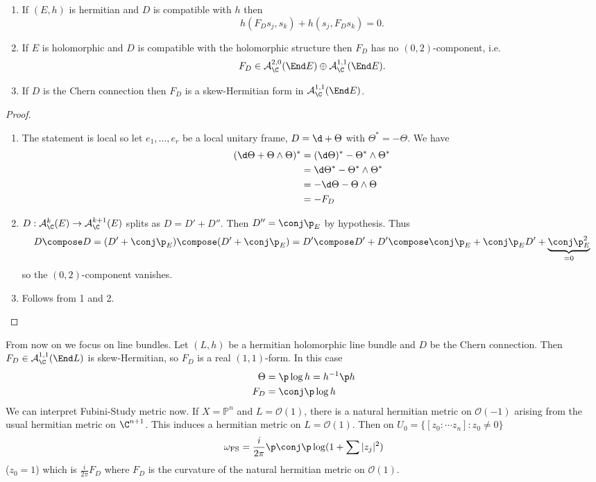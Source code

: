 \documentclass[a4paper]{article}
\renewcommand{\P}{\mathbb P} %
\newcommand{\w}{\wedge} %
\begin{document}
\begin{lemma}\leavevmode
  \begin{enumerate}
  \item If \((E, h)\) is hermitian and \(D\) is compatible with \(h\) then
    \[
      h(F_D s_j, s_k) + h(s_j, F_D s_k) = 0.
    \]
  \item If \(E\) is holomorphic and \(D\) is compatible with the holomorphic structure then \(F_D\) has no \((0, 2)\)-component, i.e.
    \[
      F_D \in \mathcal A_\C^{2, 0}(\End E) \oplus \mathcal A_\C^{1, 1}(\End E).
    \]
  \item If \(D\) is the Chern connection then \(F_D\) is a skew-Hermitian form in \(\mathcal A_\C^{1, 1}(\End E)\).
  \end{enumerate}
\end{lemma}

\begin{proof}\leavevmode
  \begin{enumerate}
  \item The statement is local so let \(e_1, \dots, e_r\) be a local unitary frame, \(D = \d + \Theta\) with \(\Theta^* = - \Theta\). We have
    \begin{align*}
      (\d \Theta + \Theta \w \Theta)^*
      &= (\d \Theta)^* - \Theta^* \w \Theta^* \\
      &= \d \Theta^* - \Theta^* \w \Theta^* \\
      &= -\d \Theta - \Theta \w \Theta \\
      &= -F_D
    \end{align*}
  \item \(D: \mathcal A_\C^k(E) \to \mathcal A_\C^{k + 1}(E)\) splits as \(D = D' + D''\). Then \(D'' = \conj \p_E\) by hypothesis. Thus
    \[
      D \compose D
      = (D' + \conj \p_E) \compose (D' + \conj \p_E)
      = D' \compose D' + D' \compose \conj \p_E + \conj \p_E D' + \underbrace{\conj \p_E^2}_{= 0}
    \]
    so the \((0, 2)\)-component vanishes.
  \item Follows from 1 and 2.
  \end{enumerate}
\end{proof}

From now on we focus on line bundles. Let \((L, h)\) be a hermitian holomorphic line bundle and \(D\) be the Chern connection. Then \(F_D \in \mathcal A_\C^{1, 1}(\End L)\) is skew-Hermitian, so \(F_D\) is a real \((1, 1)\)-form. In this case
\begin{align*}
  \Theta &= \p \log h = h^{-1} \p h \\
  F_D &= \conj \p \log h
\end{align*}
We can interpret Fubini-Study metric now. If \(X = \P^n\) and \(L = \mathcal O(1)\), there is a natural hermitian metric on \(\mathcal O(-1)\) arising from the usual hermitian metric on \(\C^{n + 1}\). This induces a hermitian metric on \(L = \mathcal O(1)\). Then on \(U_0 = \{[z_0: \cdots z_n]: z_0 \neq 0\}\)
\[
  \omega_{\text{FS}} = \frac{i}{2\pi} \p \conj \p \log (1 + \sum |z_j|^2)
\]
(\(z_0 = 1\)) which is \(\frac{i}{2\pi} F_D\) where \(F_D\) is the curvature of the natural hermitian metric on \(\mathcal O(1)\).
\end{document}

